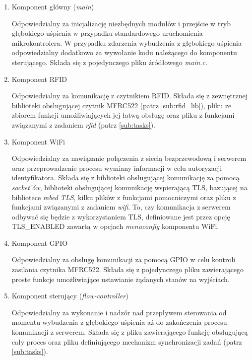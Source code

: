             \begin{enumerate}
                \item Komponent główny (\textit{main})

                    Odpowiedzialny za inicjalizację niezbędnych modułów i przejście w tryb głębokiego uśpienia w przypadku standardowego uruchomienia mikrokontrolera. W przypadku zdarzenia wybudzenia z głębokiego uśpienia odpowiedzialny dodatkowo za wywołanie kodu należącego do komponentu sterującego. Składa się z pojedynczego pliku źródłowego \textit{main.c}.

                \item Komponent RFID

                    Odpowiedzialny za komunikację z czytnikiem RFID. Składa się z zewnętrznej biblioteki obsługującej czytnik MFRC522 (patrz \ref{sub:rfid_lib}), pliku ze zbiorem funkcji umożliwiających jej łatwą obsługę oraz pliku z funkcjami związanymi z zadaniem \textit{rfid} (patrz \ref{sub:tasks}).

                \item Komponent WiFi

                    Odpowiedzialny za nawiązanie połączenia z siecią bezprzewodową i serwerem oraz przeprowadzenie procesu wymiany informacji w celu autoryzacji identyfikatora. Składa się z biblioteki obsługującej komunikację za pomocą \textit{socket'ów}, biblioteki obsługującej komunikację wspierającą TLS, bazującej na bibliotece \textit{mbed TLS}, kilku plików z funkcjami pomocniczymi oraz pliku z funkcjami związanymi z zadaniem \textit{wifi}. To, czy komunikacja z serwerem odbywać się będzie z wykorzystaniem TLS, definiowane jest przez opcję TLS\_ENABLED zawartą w opcjach \textit{menuconfig} komponentu WiFi.

                \item Komponent GPIO

                    Odpowiedzialny za obsługę komunikacji za pomocą GPIO w celu kontroli zasilania czytnika MFRC522. Składa się z pojedynczego pliku zawierającego proste funkcje umożliwiające ustawianie żądanych stanów na wyjściach.

                \item Komponent sterujący (\textit{flow-controller})

                    Odpowiedzialny za wykonanie i nadzór nad przepływem sterowania od momentu wybudzenia z głębokiego uśpienia aż do zakończenia procesu komunikacji z serwerem. Składa się z pliku zawierającego funkcję obsługującą cały proces oraz pliku definiującego mechanizm synchronizacji zadań (patrz \ref{sub:tasks}).

            \end{enumerate}

